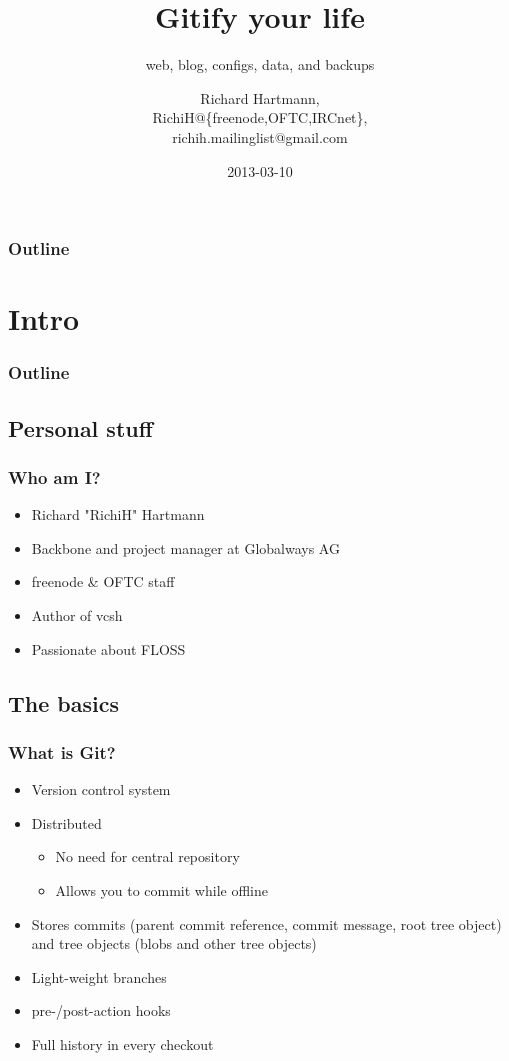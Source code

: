 \documentclass[t]{beamer}
\title{Gitify your life}
\subtitle{web, blog, configs, data, and backups}
\author{Richard Hartmann,\\
RichiH@\{freenode,OFTC,IRCnet\},\\
richih.mailinglist@gmail.com}
\date{2013-03-10}
\begin{document}
\setcounter{tocdepth}{1}

\begin{frame}
	\titlepage
\end{frame}

\begin{frame}
	\frametitle{Outline}
	\tableofcontents
\end{frame}


\section{Intro}

\begin{frame}
	\frametitle{Outline}
	\tableofcontents[currentsection]
\end{frame}

\subsection{Personal stuff}

\begin{frame}
	\frametitle{Who am I?}
	\begin{itemize}
		\item Richard "RichiH" Hartmann
		\item Backbone and project manager at Globalways AG
		\item freenode \& OFTC staff
		\item Author of vcsh
		\item Passionate about FLOSS
	\end{itemize}
\end{frame}

\subsection{The basics}

\begin{frame}
	\frametitle{What is Git?}
	\begin{itemize}
		\item Version control system
		\item Distributed
		\begin{itemize}
			\item No need for central repository
			\item Allows you to commit while offline
		\end{itemize}
		\item Stores commits (parent commit reference, commit message, root tree object) and tree objects (blobs and other tree objects)
		\item Light-weight branches
		\item pre-/post-action hooks
		\item Full history in every checkout
	\end{itemize}
\end{frame}
\end{document}
